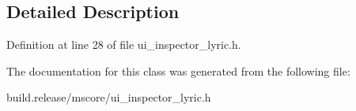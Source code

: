 \subsection{Detailed Description}


Definition at line 28 of file ui\+\_\+inspector\+\_\+lyric.\+h.



The documentation for this class was generated from the following file\+:\begin{DoxyCompactItemize}
\item 
build.\+release/mscore/ui\+\_\+inspector\+\_\+lyric.\+h\end{DoxyCompactItemize}
